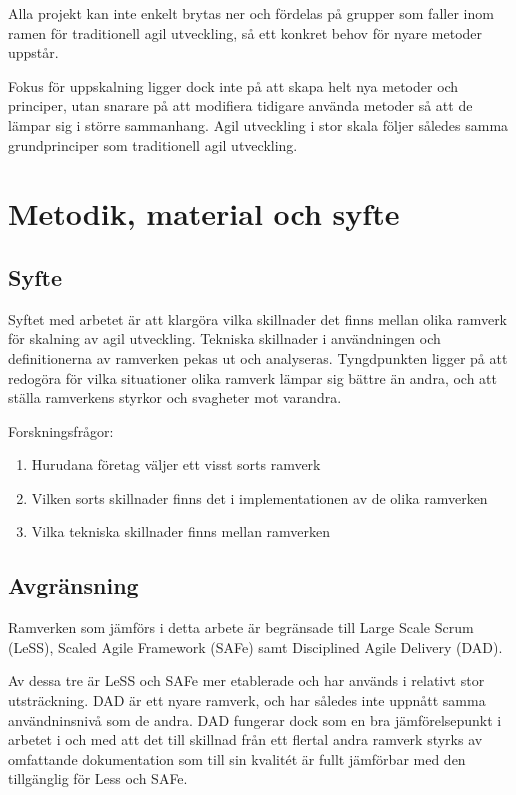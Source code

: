 		Alla projekt kan inte enkelt brytas ner och fördelas på grupper som faller inom ramen för traditionell agil utveckling, så ett konkret behov för nyare metoder uppstår.
		
		Fokus för uppskalning ligger dock inte på att skapa helt nya metoder och principer, utan snarare på att modifiera tidigare använda metoder så att de lämpar sig i större sammanhang. Agil utveckling i stor skala följer således samma grundprinciper som traditionell agil utveckling.

		
	\newpage

\section{Metodik, material och syfte}
	
	
	\subsection{Syfte}
	
		Syftet med arbetet är att klargöra vilka skillnader det finns mellan olika ramverk för skalning av agil utveckling. Tekniska skillnader i användningen och definitionerna av ramverken pekas ut och analyseras.
		Tyngdpunkten ligger på att redogöra för vilka situationer olika ramverk lämpar sig bättre än andra, och att ställa ramverkens styrkor och svagheter mot varandra. \newline
		
		Forskningsfrågor:
		\begin{enumerate}
			\item Hurudana företag väljer ett visst sorts ramverk
			\item Vilken sorts skillnader finns det i implementationen av de olika ramverken
			\item Vilka tekniska skillnader finns mellan ramverken
		\end{enumerate}
			
	
	\subsection{Avgränsning}
	
		Ramverken som jämförs i detta arbete är begränsade till Large Scale Scrum (LeSS), Scaled Agile Framework (SAFe) samt Disciplined Agile Delivery (DAD).
		
		Av dessa tre är LeSS och SAFe mer etablerade och har används i relativt stor utsträckning. DAD är ett nyare ramverk, och har således inte uppnått samma användninsnivå som de andra. DAD fungerar dock som en bra jämförelsepunkt i arbetet i och med att det till skillnad från ett flertal andra ramverk styrks av omfattande dokumentation som till sin kvalitét är fullt jämförbar med den tillgänglig för Less och SAFe.
		\cite{ask_matrix}
		
